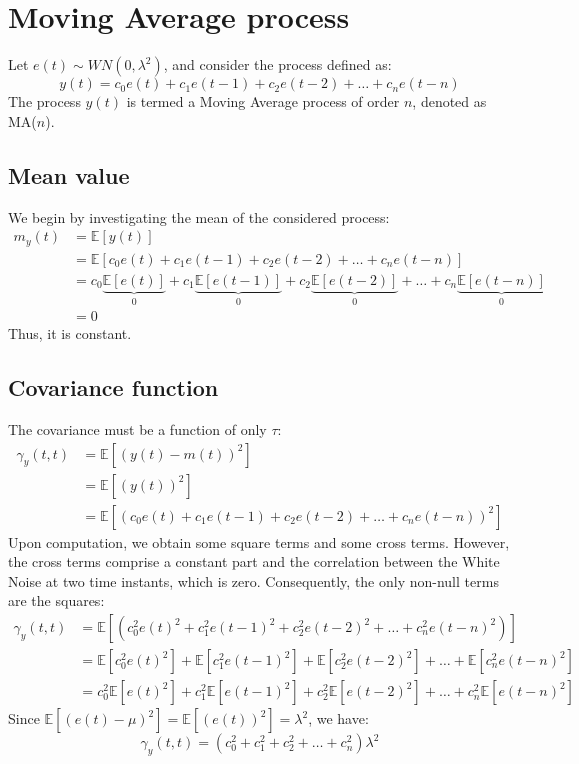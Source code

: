 \section{Moving Average process}

Let $e(t)\sim WN(0,\lambda^2)$, and consider the process defined as:
\[y(t)=c_0e(t)+c_1e(t-1)+c_2e(t-2)+\dots+c_ne(t-n)\]
The process $y(t)$ is termed a Moving Average process of order $n$, denoted as MA($n$).

\subsection{Mean value}
We begin by investigating the mean of the considered process:
\begin{align*}
    m_y(t)  &=\mathbb{E}\left[y(t)\right] \\
            &=\mathbb{E}\left[c_0e(t)+c_1e(t-1)+c_2e(t-2)+\dots+c_ne(t-n)\right] \\
            &=c_0\underbrace{\mathbb{E}\left[e(t)\right]}_0  + c_1\underbrace{\mathbb{E}\left[e(t-1)\right]}_0  + c_2\underbrace{\mathbb{E}\left[e(t-2)\right]}_0  + \dots + c_n\underbrace{\mathbb{E}\left[e(t-n)\right]}_0 \\
            &=0
\end{align*}
Thus, it is constant.

\subsection{Covariance function}
The covariance must be a function of only $\tau$: 
\begin{align*}
    \gamma_y(t,t)   &=\mathbb{E}\left[\left(y(t)-m(t)\right)^2\right] \\
                    &=\mathbb{E}\left[\left(y(t)\right)^2\right] \\
                    &=\mathbb{E}\left[\left(c_0e(t)+c_1e(t-1)+c_2e(t-2)+\dots+c_ne(t-n)\right)^2\right] 
\end{align*}
Upon computation, we obtain some square terms and some cross terms. 
However, the cross terms comprise a constant part and the correlation between the White Noise at two time instants, which is zero. 
Consequently, the only non-null terms are the squares:
\begin{align*}
    \gamma_y(t,t)   &=\mathbb{E}\left[\left(c_0^2e(t)^2+c_1^2e(t-1)^2+c_2^2e(t-2)^2+\dots+c_n^2e(t-n)^2\right)\right] \\
                    &=\mathbb{E}\left[c_0^2e(t)^2\right]+\mathbb{E}\left[c_1^2e(t-1)^2\right]+\mathbb{E}\left[c_2^2e(t-2)^2\right]+\dots+\mathbb{E}\left[c_n^2e(t-n)^2\right] \\
                    &=c_0^2\mathbb{E}\left[e(t)^2\right]+c_1^2\mathbb{E}\left[e(t-1)^2\right]+c_2^2\mathbb{E}\left[e(t-2)^2\right]+\dots+c_n^2\mathbb{E}\left[e(t-n)^2\right]
\end{align*}
Since $\mathbb{E}\left[\left(e(t)-\mu\right)^2\right]=\mathbb{E}\left[\left(e(t)\right)^2\right]=\lambda^2$, we have:
\[\gamma_y(t,t)=\left(c_0^2+c_1^2+c_2^2+\dots+c_n^2\right)\lambda^2\]

